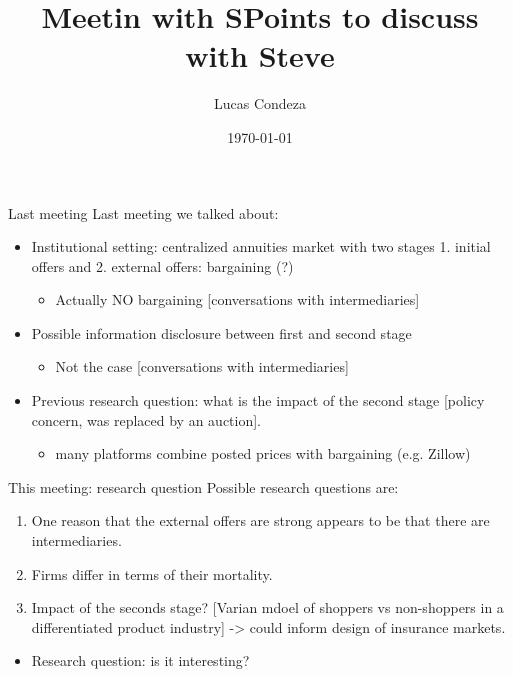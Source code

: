 \documentclass[10pt,aspectratio=169]{beamer}
\title{Meetin with SPoints to discuss with Steve}
\author{%
 Lucas Condeza
\inst{1} \and
}
\institute{
  \inst{1} Yale University \\
}
\date{\today}
\begin{document}



\begin{frame}{Last meeting}
Last meeting we talked about:
\begin{itemize}
    \item Institutional setting: centralized annuities market with two stages 1. initial offers and 2. external offers: bargaining (?)  
    \begin{itemize}
        \item Actually NO bargaining [conversations with intermediaries]
    \end{itemize}
    \item Possible information disclosure between first and second stage 
    \begin{itemize}
        \item Not the case [conversations with intermediaries]
    \end{itemize}

    \item Previous research question: what is the impact of the second stage [policy concern, was replaced by an auction]. 
    \begin{itemize}
        \item  many platforms combine posted prices with bargaining (e.g. Zillow)
    \end{itemize}
\end{itemize}
\end{frame}





\begin{frame}{This meeting: research question}
Possible research questions are: 



 \begin{enumerate}
        \item One reason that the external offers are strong appears to be that there are intermediaries. 

        \item Firms differ in terms of their mortality. 
        
   
        \item Impact of the seconds stage?  [Varian mdoel of shoppers vs non-shoppers in a differentiated product industry] -> could inform design of insurance markets.

    \end{enumerate}
    




\begin{itemize}
   
   
    \item Research question: is it interesting? 


     
\end{itemize}
\end{frame}


 
\end{document}
